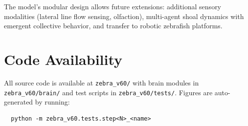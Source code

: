 \documentclass[11pt,a4paper]{article}
\begin{document}
The model's modular design allows future extensions: additional sensory
modalities (lateral line flow sensing, olfaction), multi-agent shoal
dynamics with emergent collective behavior, and transfer to robotic
zebrafish platforms.

\section{Code Availability}

All source code is available at \texttt{zebra\_v60/} with brain modules in
\texttt{zebra\_v60/brain/} and test scripts in \texttt{zebra\_v60/tests/}.
Figures are auto-generated by running:
\begin{verbatim}
  python -m zebra_v60.tests.step<N>_<name>
\end{verbatim}
\end{document}
